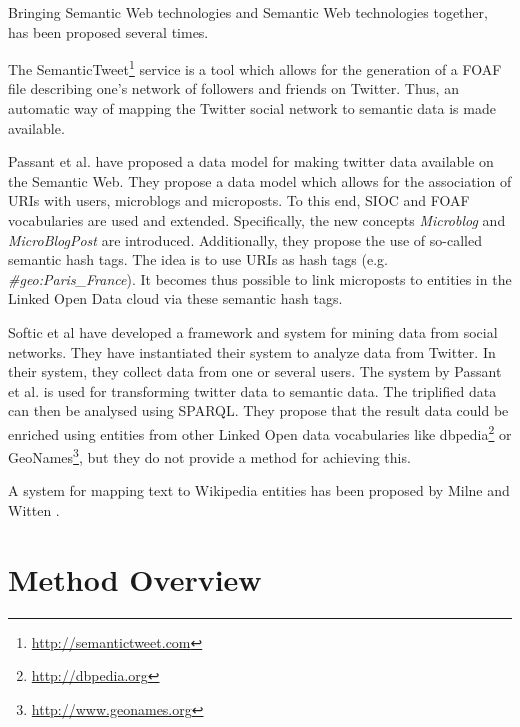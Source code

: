 \documentclass{llncs}
\begin{document}
Bringing Semantic Web technologies and Semantic Web technologies together, has been proposed several times.

The SemanticTweet\footnote{\url{http://semantictweet.com}} service is a tool which allows for the generation of a FOAF file describing one's network of followers and friends on Twitter. Thus, an automatic way of mapping the Twitter social network to semantic data is made available.

Passant et al. \cite{key:smob} have proposed a data model for making twitter data available on the Semantic Web. They propose a data model which allows for the association of URIs with users, microblogs and microposts. To this end, SIOC and FOAF vocabularies are used and extended. Specifically, the new concepts \emph{Microblog} and \emph{MicroBlogPost} are introduced. Additionally, they propose the use of so-called semantic hash tags. The idea is to use URIs as hash tags (e.g. \emph{\#geo:Paris\_France}). It becomes thus possible to link microposts to entities in the Linked Open Data cloud via these semantic hash tags. 

Softic et al \cite{key:softic} have developed a framework and system for mining data from social networks. They have instantiated their system to analyze data from Twitter. In their system, they collect data from one or several users. The system by Passant et al. \cite{key:smob} is used for transforming twitter data to semantic data. The triplified data can then be analysed using SPARQL. They propose that the result data could be enriched using entities from other Linked Open data vocabularies like dbpedia\footnote{\url{http://dbpedia.org}} or GeoNames\footnote{\url{http://www.geonames.org}}, but they do not provide a method for achieving this.

A system for mapping text to Wikipedia entities has been proposed by Milne and Witten \cite{key:wikifier}. 



\section{Method Overview}
\label{sect:method}
\end{document}
